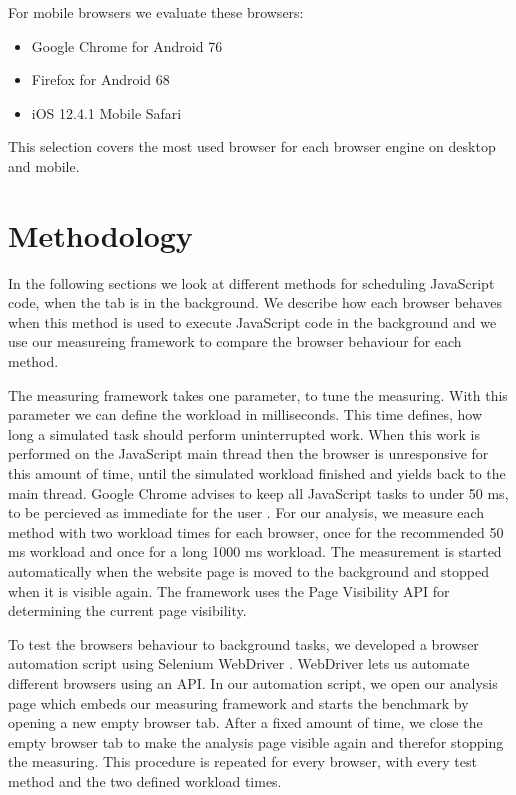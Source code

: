 \documentclass[
	ruledheaders=section,%
	class=report,%
	thesis={type=bachelor},%
	accentcolor=9c,%
	custommargins=true,%
	marginpar=false,%
	parskip=half-,%
	fontsize=11pt,%
]{tudapub}
\begin{document}
  For mobile browsers we evaluate these browsers:

  \begin{itemize}
  \item Google Chrome for Android 76
  \item Firefox for Android 68
  \item iOS 12.4.1 Mobile Safari
  \end{itemize}

  This selection covers the most used browser for each browser engine on desktop and mobile. 

  \section{Methodology}

  In the following sections we look at different methods for scheduling JavaScript code, when the tab is in the background. We describe how each browser behaves when this method is used to execute JavaScript code in the background and we use our measureing framework to compare the browser behaviour for each method.

  The measuring framework takes one parameter, to tune the measuring. With this parameter we can define the workload in milliseconds. This time defines, how long a simulated task should perform uninterrupted work. When this work is performed on the JavaScript main thread then the browser is unresponsive for this amount of time, until the simulated workload finished and yields back to the main thread. Google Chrome advises to keep all JavaScript tasks to under 50 ms, to be percieved as immediate for the user \cite{chrome-rail-model}. For our analysis, we measure each method with two workload times for each browser, once for the recommended 50 ms workload and once for a long 1000 ms workload. The measurement is started automatically when the website page is moved to the background and stopped when it is visible again. The framework uses the Page Visibility API \cite{mdn-page-visibility} for determining the current page visibility.

  To test the browsers behaviour to background tasks, we developed a browser automation script using Selenium WebDriver \cite{webdriver}. WebDriver lets us automate different browsers using an API. In our automation script, we open our analysis page which embeds our measuring framework and starts the benchmark by opening a new empty browser tab. After a fixed amount of time, we close the empty browser tab to make the analysis page visible again and therefor stopping the measuring. This procedure is repeated for every browser, with every test method and the two defined workload times.
\end{document}
